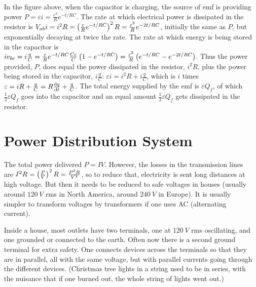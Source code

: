 In the figure above, when the capacitor is charging, the source of emf is providing power $P = \varepsilon i = \frac{\varepsilon^2}{R}e^{-t/RC}$. The rate at which electrical power is dissipated in the resistor is $V_{ab}i = i^2R = \left( \frac{\varepsilon}{R}e^{-t/RC} \right)^2 R = \frac{\varepsilon^2}{R}e^{-2t/RC}$, initially the same as $P$, but exponentially decaying at twice the rate. The rate at which energy is being stored in the capacitor is $iv_{bc} = i\frac{q}{C} = \frac{\varepsilon}{R}e^{-t/RC}\frac{C\varepsilon}{C}\left( 1-e^{-t/RC} \right) = \frac{\varepsilon^2}{R}\left(  e^{-t/RC} - e^{-2t/RC}  \right)$. Thus the power provided, $P$, does equal the power dissipated in the resistor, $i^2R$, plus the power being stored in the capacitor, $i\frac{q}{C}$: $\varepsilon i = i^2R + i\frac{q}{C}$, which is $i$ times $\varepsilon = iR + \frac{q}{C} = R\frac{\operatorname{d\!} q}{\operatorname{d\!} t} + \frac{q}{C}$. The total energy supplied by the emf is $\varepsilon Q_f$, of which $\frac{1}{2}\varepsilon Q_f$ goes into the capacitor and an equal amount $\frac{1}{2} \varepsilon Q_f$ gets dissipated in the resistor.

\section{Power Distribution System}
The total power delivered $P = IV$. However, the losses in the transmission lines are $I^2R = \left(\frac{P}{V}\right)^2R = \frac{P^2R}{V^2}$, so to reduce that, electricity is sent long distances at high voltage. But then it needs to be reduced to safe voltages in houses (usually around $\SI{120}{V}$ rms in North America, around $\SI{240}{V}$ in Europe). It is usually simpler to transform voltages by transformers if one uses AC (alternating current).

Inside a house, most outlets have two terminals, one at $\SI{120}{V}$ rms oscillating, and one grounded or connected to the earth. Often now there is a second ground terminal for extra safety. One connects devices across the terminals so that they are in parallel, all with the same voltage, but with parallel currents going through the different devices. (Christmas tree lights in a string used to be in series, with the nuisance that if one burned out, the whole string of lights went out.)

